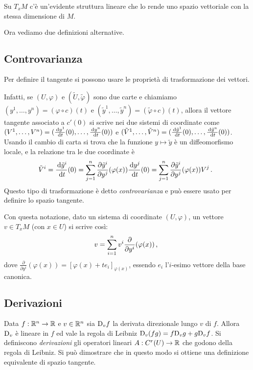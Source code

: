  \begin{remark}
  Su $T_xM$ c'è un'evidente struttura lineare che lo rende uno spazio vettoriale con la
  stessa dimensione di $M$.
 \end{remark}

Ora vediamo due definizioni alternative.
 
\subsection{Controvarianza}
Per definire il tangente si possono usare le proprietà di trasformazione dei vettori.

Infatti, se $(U,\varphi)$ e $(\tilde{U},\tilde{\varphi})$ sono due carte e chiamiamo $(y^1,\dots,y^n)=(\varphi\circ c)(t)$ e $(\tilde{y}^1,\dots,\tilde{y}^n)=(\tilde{\varphi}\circ c)(t)$, allora il vettore tangente associato a $c'(0)$ si scrive nei due sistemi di coordinate come $(V^1,\dots,V^n)=(\frac{\,\mathrm d y^1}{\,\mathrm d t}(0),\dots,\frac{\,\mathrm d y^n}{\,\mathrm d t}(0))$ e $(\tilde{V}^1,\dots,\tilde{V}^n)=(\frac{\,\mathrm d\tilde{y}^1}{\,\mathrm d t}(0),\dots,\frac{\,\mathrm d\tilde{y}^n}{\,\mathrm d t}(0))$.
Usando il cambio di carta si trova che la funzione $y\mapsto\tilde{y}$ è un diffeomorfismo locale, e la relazione tra le due coordinate è 
\begin{equation*}
	\tilde{V}^i=\frac{\,\mathrm d\tilde{y}^i}{\,\mathrm d t}(0)=\sum_{j=1}^n\frac{\partial\tilde{y}^i}{\partial y^j}(\varphi(x)) \frac{\,\mathrm d y^j}{\,\mathrm d t}(0)=\sum_{j=1}^n\frac{\partial\tilde{y}^i}{\partial y^j}(\varphi(x))V^j\, \text{. }
\end{equation*}
Questo tipo di trasformazione è detto \emph{controvarianza} e può essere usato per definire lo spazio tangente. 

Con questa notazione, dato un sistema di coordinate $(U,\varphi)$, un vettore $v\in T_x M$ (con $x\in U$) si scrive così:
\begin{equation*}
	v=\sum_{i=1}^nv^i\frac{\partial}{\partial y^i}(\varphi(x))\, \text{, }
\end{equation*}
dove $\frac{\partial}{\partial y^i}(\varphi(x))=[\varphi(x)+te_i]_{\varphi(x)}$, essendo $e_i$ l'$i$-esimo vettore della base canonica.

\subsection{Derivazioni} 
Data $f:\mathbb R^n\to\mathbb R$ e $v\in\mathbb R^n$ sia $\mathrm D_vf$ la derivata direzionale lungo $v$ di $f$. Allora $\mathrm D_v$ è lineare in $f$ ed vale la regola di Leibniz $\mathrm D_v(fg)=f\mathrm D_vg+g\mathrm D_vf$. Si definiscono \emph{derivazioni} gli operatori lineari $A:C^r(U)\to\mathbb R$ che godono della regola di Leibniz. Si può dimostrare che in questo modo si ottiene una definizione equivalente di spazio tangente.
 
